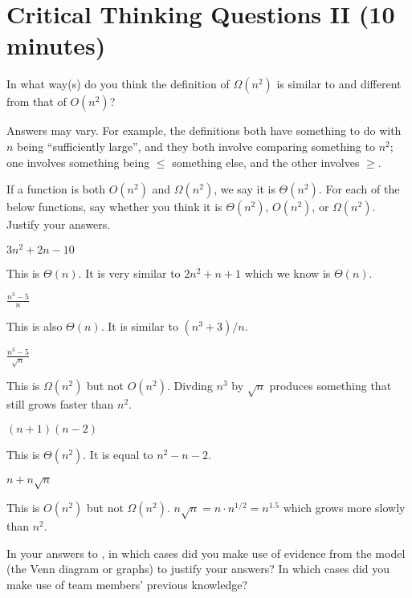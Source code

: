 \documentclass{tufte-handout}
\begin{document}
\pause

\section{Critical Thinking Questions II (10 minutes)}

\begin{questions}
\item In what way(s) do you think the definition of $\Omega(n^2)$ is similar to
  and different from that of $O(n^2)$?
  \begin{answer}
    Answers may vary.  For example, the definitions both have
    something to do with $n$ being ``sufficiently large'', and they
    both involve comparing something to $n^2$; one involves something
    being $\leq$ something else, and the other involves $\geq$.
  \end{answer}
\item \label{q:classify} If a function is both $O(n^2)$ and $\Omega(n^2)$, we say it is
  $\Theta(n^2)$.
  For each of the below functions, say whether you
  think it is $\Theta(n^2)$, $O(n^2)$, or $\Omega(n^2)$.  Justify your answers.
  \begin{subquestions}
  \item $3n^2 + 2n - 10$
    \begin{answer}
      This is $\Theta(n)$.  It is very similar to $2n^2 + n + 1$ which
      we know is $\Theta(n)$.
    \end{answer}
  \item $\displaystyle \frac{n^3 - 5}{n}$
    \begin{answer}
      This is also $\Theta(n)$.  It is similar to $(n^3 + 3)/n$.
    \end{answer}
  \item $\displaystyle \frac{n^3 - 5}{\sqrt n}$
    \begin{answer}
      This is $\Omega(n^2)$ but not $O(n^2)$.  Divding $n^3$ by $\sqrt
      n$ produces something that still grows faster than $n^2$.
    \end{answer}
  \item $(n+1)(n-2)$
    \begin{answer}
      This is $\Theta(n^2)$. It is equal to $n^2 - n - 2$.
    \end{answer}
  \item $n + n \sqrt n$
    \begin{answer}
      This is $O(n^2)$ but not $\Omega(n^2)$.  $n \sqrt n = n \cdot
      n^{1/2} = n^{1.5}$ which grows more slowly than $n^2$.
    \end{answer}
  \end{subquestions}
\item In your answers to , in which cases did you
  make use of evidence from the model (the Venn diagram or graphs) to
  justify your answers?  In which cases did you make use of team
  members' previous knowledge?
\end{questions}
\end{document}
